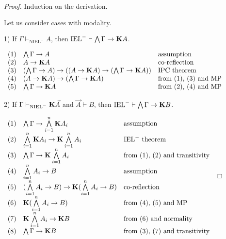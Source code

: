 \documentclass[a4paper]{article}
\begin{document}
  \begin{proof}
Induction on the derivation.

  \vspace{\baselineskip}

Let us consider cases with modality.

\vspace{\baselineskip}

1) If $\Gamma \vdash_{\text{NIEL}^{-}} A$, then $\text{IEL}^{-} \vdash \bigwedge \Gamma \rightarrow {\bf K}A$.

$\begin{array}{lll}
(1) & \bigwedge \Gamma \rightarrow A & \text{assumption}\\
(2) & A \rightarrow {\bf K}A &\text{co-reflection}\\
(3) & (\bigwedge \Gamma \rightarrow A) \rightarrow ((A \rightarrow {\bf K}A) \rightarrow (\bigwedge \Gamma \rightarrow {\bf K}A))&\text{IPC theorem}\\
(4) & (A \rightarrow {\bf K}A) \rightarrow (\bigwedge \Gamma \rightarrow {\bf K}A) &\text{from (1), (3) and MP}\\
(5) & \bigwedge \Gamma \rightarrow {\bf K}A &\text{from (2), (4) and MP}\\
\end{array}$

\vspace{\baselineskip}

2) If $\Gamma \vdash_{\text{NIEL}^{-}} {\bf K} \vec{A}$ and $\vec{A} \vdash B$, then $\text{IEL}^{-} \vdash \bigwedge \Gamma \rightarrow {\bf K}B$.

$\begin{array}{lll}
(1) &\bigwedge \Gamma \rightarrow \bigwedge \limits_{i = 1}^{n} {\bf K} A_i & \text{assumption} \\
(2) &\bigwedge \limits_{i = 1}^{n} {\bf K} A_i \rightarrow {\bf K} \bigwedge \limits_{i = 1}^{n} A_i& \text{IEL$^{-}$ theorem} \\
(3) &\bigwedge \Gamma \rightarrow {\bf K} \bigwedge \limits_{i = 1}^{n} A_i & \text{from (1), (2) and transitivity} \\
(4) &\bigwedge \limits_{i = 1}^{n} A_i \rightarrow B& \text{assumption} \\
(5) &(\bigwedge \limits_{i = 1}^{n} A_i \rightarrow B) \rightarrow {\bf K} (\bigwedge \limits_{i = 1}^{n} A_i \rightarrow B)& \text{co-reflection}\\
(6) &{\bf K} (\bigwedge \limits_{i = 1}^{n} A_i \rightarrow B)& \text{from (4), (5) and MP} \\
(7) &{\bf K} \bigwedge \limits_{i = 1}^{n} A_i \rightarrow {\bf K} B & \text{from (6) and normality} \\
(8) &\bigwedge \Gamma \rightarrow {\bf K} B & \text{from (3), (7) and transitivity}
\end{array}$

  \end{proof}
\end{document}
